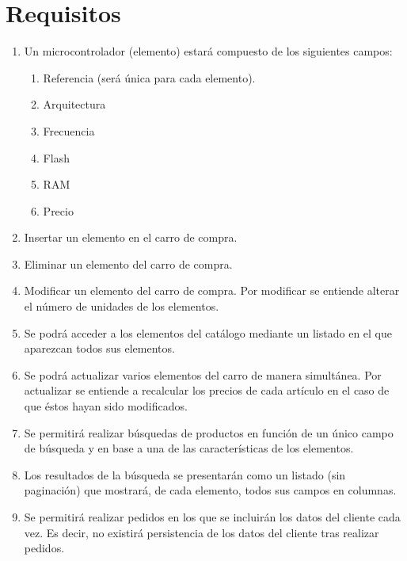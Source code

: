 \documentclass[10pt,a4paper]{article}
\begin{document}
\section{Requisitos}
\begin{enumerate}

\item Un microcontrolador (elemento) estará compuesto de los siguientes campos: 
	\begin{enumerate}
		\item Referencia (será única para cada elemento).
        \item Arquitectura
        \item Frecuencia
        \item Flash
        \item RAM
        \item Precio
	\end{enumerate}
	
\item Insertar un elemento en el carro de compra.
   
\item Eliminar un elemento del carro de compra.
	
\item Modificar un elemento del carro de compra. Por modificar se entiende alterar el número de unidades de los elementos.

\item Se podrá acceder a los elementos del catálogo mediante un listado en el que aparezcan todos sus elementos.

\item Se podrá actualizar varios elementos del carro de manera simultánea. Por actualizar se entiende a recalcular los precios de cada artículo en el caso de que éstos hayan sido modificados.

\item Se permitirá realizar búsquedas de productos en función de un único campo de búsqueda y en base a una de las características de los elementos. 
	
\item Los resultados de la búsqueda se presentarán como un listado (sin paginación) que mostrará, de cada elemento, todos sus campos en columnas.

\item Se permitirá realizar pedidos en los que se incluirán los datos del cliente cada vez. Es decir, no existirá persistencia de los datos del cliente tras realizar pedidos.


\end{enumerate}
\end{document}
